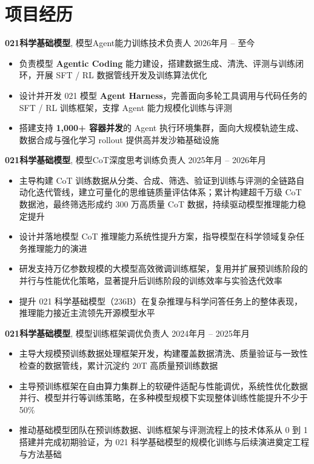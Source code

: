 \documentclass[
  a4paper,
  12pt
]{cv}
\author{富律文}
\renewcommand{\DatestampYMD}[3]{\mbox{#1年\number#2月}}
\begin{document}
\maketitle

\section{项目经历}

{\textbf{021科学基础模型}},
模型Agent能力训练技术负责人
\hfill
\DatestampYMD{2026}{01}{01} --
至今

\begin{itemize}
\item 负责模型 \textbf{Agentic Coding} 能力建设，搭建数据生成、清洗、评测与训练闭环，开展 SFT / RL 数据管线开发及训练算法优化
\item 设计并开发 021 模型 \textbf{Agent Harness}，完善面向多轮工具调用与代码任务的 SFT / RL 训练框架，支撑 Agent 能力规模化训练与评测
\item 搭建支持 \textbf{1,000+ 容器并发}的 Agent 执行环境集群，面向大规模轨迹生成、数据合成与强化学习 rollout 提供高并发沙箱基础设施
\end{itemize}

{\textbf{021科学基础模型}},
模型CoT深度思考训练负责人
\hfill
\DatestampYMD{2025}{04}{01} --
\DatestampYMD{2026}{01}{01}

\begin{itemize}
\item 主导构建 CoT 训练数据从分类、合成、筛选、验证到训练与评测的全链路自动化迭代管线，建立可量化的思维链质量评估体系；累计构建超千万级 CoT 数据池，最终筛选形成约 300 万高质量 CoT 数据，持续驱动模型推理能力稳定提升
\item 设计并落地模型 CoT 推理能力系统性提升方案，指导模型在科学领域复杂任务推理能力的演进
\item 研发支持万亿参数规模的大模型高效微调训练框架，复用并扩展预训练阶段的并行与性能优化策略，显著提升后训练阶段的训练效率与实验迭代效率
\item 提升 021 科学基础模型（236B）在复杂推理与科学问答任务上的整体表现，推理能力接近主流领先开源模型水平
\end{itemize}

{\textbf{021科学基础模型}},
模型训练框架调优负责人
\hfill
\DatestampYMD{2024}{04}{03} --
\DatestampYMD{2025}{04}{01}

\begin{itemize}
\item 主导大规模预训练数据处理框架开发，构建覆盖数据清洗、质量验证与一致性检查的数据管线，累计沉淀约 20T 高质量预训练数据
\item 主导预训练框架在自由算力集群上的软硬件适配与性能调优，系统性优化数据并行、模型并行等训练策略，在多种模型规模下实现整体训练性能提升不少于 50\%
\item 推动基础模型团队在预训练数据、训练框架与评测流程上的技术体系从 0 到 1 搭建并完成初期验证，为 021 科学基础模型的规模化训练与后续演进奠定工程与方法基础
\end{itemize}
\end{document}
